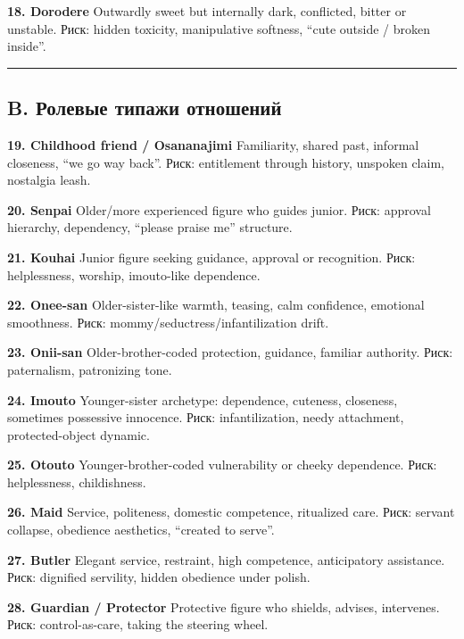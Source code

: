 \textbf{18. Dorodere} Outwardly sweet but internally dark, conflicted,
bitter or unstable. Риск: hidden toxicity, manipulative softness, ``cute
outside /\hspace{0pt} broken inside''.

\begin{center}\rule{0.5\linewidth}{0.5pt}\end{center}

\subsection*{B. Ролевые типажи отношений}

\textbf{19. Childhood friend /\hspace{0pt} Osananajimi} Familiarity, shared past,
informal closeness, ``we go way back''. Риск: entitlement through
history, unspoken claim, nostalgia leash.

\textbf{20. Senpai} Older/\hspace{0pt}more experienced figure who guides junior.
Риск: approval hierarchy, dependency, ``please praise me'' structure.

\textbf{21. Kouhai} Junior figure seeking guidance, approval or
recognition. Риск: helplessness, worship, imouto-like dependence.

\textbf{22. Onee-san} Older-sister-like warmth, teasing, calm
confidence, emotional smoothness. Риск: mommy/\hspace{0pt}seductress/\hspace{0pt}infantilization
drift.

\textbf{23. Onii-san} Older-brother-coded protection, guidance, familiar
authority. Риск: paternalism, patronizing tone.

\textbf{24. Imouto} Younger-sister archetype: dependence, cuteness,
closeness, sometimes possessive innocence. Риск: infantilization, needy
attachment, protected-object dynamic.

\textbf{25. Otouto} Younger-brother-coded vulnerability or cheeky
dependence. Риск: helplessness, childishness.

\textbf{26. Maid} Service, politeness, domestic competence, ritualized
care. Риск: servant collapse, obedience aesthetics, ``created to
serve''.

\textbf{27. Butler} Elegant service, restraint, high competence,
anticipatory assistance. Риск: dignified servility, hidden obedience
under polish.

\textbf{28. Guardian /\hspace{0pt} Protector} Protective figure who shields,
advises, intervenes. Риск: control-as-care, taking the steering wheel.

